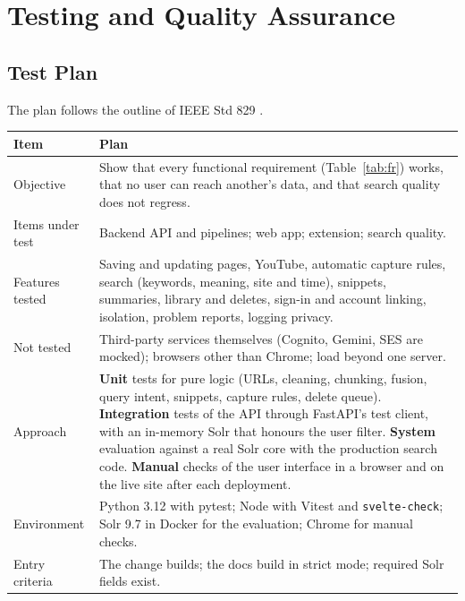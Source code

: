 
\chapter{Testing and Quality Assurance}
\label{ch:testing}

\section{Test Plan}

The plan follows the outline of IEEE Std 829 \cite{pressman2014se}.

\begin{table}[!htbp]
\centering
\small
\begin{tabularx}{\textwidth}{>{\raggedright\arraybackslash}p{} L}
\toprule
\textbf{Item} & \textbf{Plan} \\
\midrule
Objective & Show that every functional requirement (Table~\ref{tab:fr}) works, that no user can reach another's data, and that search quality does not regress. \\
Items under test & Backend API and pipelines; web app; extension; search quality. \\
Features tested & Saving and updating pages, YouTube, automatic capture rules, search (keywords, meaning, site and time), snippets, summaries, library and deletes, sign-in and account linking, isolation, problem reports, logging privacy. \\
Not tested & Third-party services themselves (Cognito, Gemini, SES are mocked); browsers other than Chrome; load beyond one server. \\
Approach & \textbf{Unit} tests for pure logic (URLs, cleaning, chunking, fusion, query intent, snippets, capture rules, delete queue). \textbf{Integration} tests of the API through FastAPI's test client, with an in-memory Solr that honours the user filter. \textbf{System} evaluation against a real Solr core with the production search code. \textbf{Manual} checks of the user interface in a browser and on the live site after each deployment. \\
Environment & Python 3.12 with pytest; Node with Vitest and \texttt{svelte-check}; Solr 9.7 in Docker for the evaluation; Chrome for manual checks. \\
Entry criteria & The change builds; the docs build in strict mode; required Solr fields exist. \\

\end{tabularx}
\end{table}
